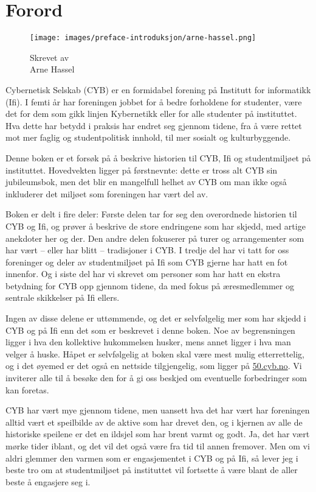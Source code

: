 \chapter*{Forord}

\begin{wrapfigure}{r}{3cm}
\vspace{-180pt}
\centering
\texttt{[image: images/preface-introduksjon/arne-hassel.png]}
\captionsetup{labelformat=empty}
\caption{Skrevet av\\Arne Hassel}
\end{wrapfigure}

Cybernetisk Selskab (CYB) er en formidabel forening på Institutt for informatikk (Ifi). I femti år har foreningen jobbet for å bedre forholdene for studenter, være det for dem som gikk linjen Kybernetikk eller for alle studenter på instituttet. Hva dette har betydd i praksis har endret seg gjennom tidene, fra å være rettet mot mer faglig og studentpolitisk innhold, til mer sosialt og kulturbyggende.

Denne boken er et forsøk på å beskrive historien til CYB, Ifi og studentmiljøet på instituttet. Hovedvekten ligger på førstnevnte: dette er tross alt CYB sin jubileumsbok, men det blir en mangelfull helhet av CYB om man ikke også inkluderer det miljøet som foreningen har vært del av.

Boken er delt i fire deler: Første delen tar for seg den overordnede historien til CYB og Ifi, og prøver å beskrive de store endringene som har skjedd, med artige anekdoter her og der. Den andre delen fokuserer på turer og arrangementer som har vært -- eller har blitt -- tradisjoner i CYB. I tredje del har vi tatt for oss foreninger og deler av studentmiljøet på Ifi som CYB gjerne har hatt en fot innenfor. Og i siste del har vi skrevet om personer som har hatt en ekstra betydning for CYB opp gjennom tidene, da med fokus på æresmedlemmer og sentrale skikkelser på Ifi ellers.

Ingen av disse delene er uttømmende, og det er selvfølgelig mer som har skjedd i CYB og på Ifi enn det som er beskrevet i denne boken. Noe av begrensningen ligger i hva den kollektive hukommelsen husker, mens annet ligger i hva man velger å huske. Håpet er selvfølgelig at boken skal være mest mulig etterrettelig, og i det øyemed er det også en nettside tilgjengelig, som ligger på \url{50.cyb.no}. Vi inviterer alle til å besøke den for å gi oss beskjed om eventuelle forbedringer som kan foretas.

CYB har vært mye gjennom tidene, men uansett hva det har vært har foreningen alltid vært et speilbilde av de aktive som har drevet den, og i kjernen av alle de historiske speilene er det en ildsjel som har brent varmt og godt. Ja, det har vært mørke tider iblant, og det vil det også være fra tid til annen fremover. Men om vi aldri glemmer den varmen som er engasjementet i CYB og på Ifi, så lever jeg i beste tro om at studentmiljøet på instituttet vil fortsette å være blant de aller beste å engasjere seg i.

